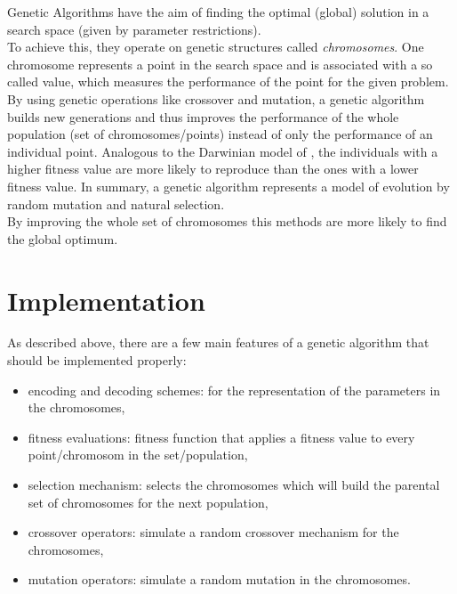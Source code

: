 

Genetic Algorithms have the aim of finding the optimal (global) solution in a search space (given by parameter restrictions).\\
To achieve this, they operate on genetic structures called \emph{chromosomes}. One chromosome represents a point in the search space and is associated with a so called  value, which measures the performance of the point for the given problem.\\
By using genetic operations like crossover and mutation, a genetic algorithm builds new generations and thus improves the performance of the whole population (set of chromosomes/points) instead of only the performance of an individual point. Analogous to the Darwinian model of , the individuals with a higher fitness value are more likely to reproduce than the ones with a lower fitness value. In summary, a genetic algorithm represents a model of evolution by random mutation and natural selection.\\
By improving the whole set of chromosomes this methods are more likely to find the global optimum.


\section{Implementation}
As described above, there are a few main features of a genetic algorithm that should be implemented properly:
\begin{itemize}
\item encoding and decoding schemes: for the representation of the parameters in the chromosomes,
\item fitness evaluations: fitness function that applies a fitness value to every point/chromosom in the set/population,
\item selection mechanism: selects the chromosomes which will build the parental set of chromosomes for the next population,
\item crossover operators: simulate a random crossover mechanism for the chromosomes,
\item mutation operators: simulate a random mutation in the chromosomes.
\end{itemize}

